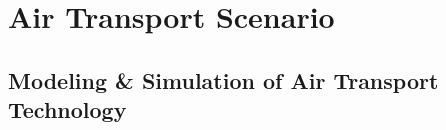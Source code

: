 

\section{Air Transport Scenario}
\label{sec:air_rail_scenario}

\subsection{Modeling \& Simulation of Air Transport Technology}
\label{sec:modeling-of-technology}




